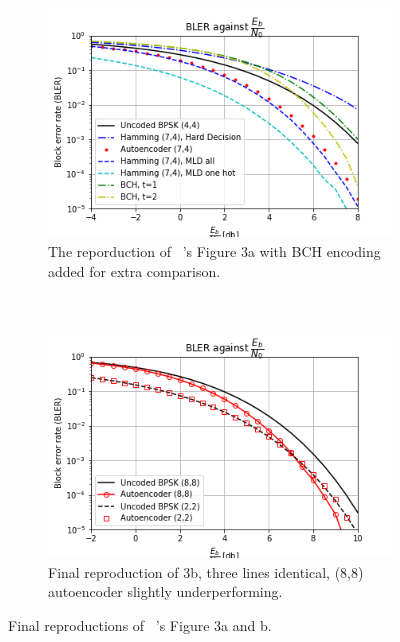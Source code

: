 \documentclass[12pt,onecolumn,letterpaper]{article}
\begin{document}
\begin{figure}[t!]
   \centering
   \begin{subfigure}[t]{0.45\textwidth}
      \centering
      \includegraphics[width=\linewidth]{figures/o_shea_3a_bler_vs_eb_bch.png}
      \caption{The reporduction of ~\cite{oShea}'s Figure 3a with BCH encoding added for extra comparison.}
      \label{fig:OSheaFigure3aBch}
  \end{subfigure}
 ~
   \begin{subfigure}[t]{0.45\textwidth}
      \centering
      \includegraphics[width=\linewidth]{figures/o_shea_3b_bler_vs_eb.png}
      \caption{Final reproduction of 3b, three lines identical, (8,8) autoencoder slightly underperforming.}
      \label{fig:OSheaFigure3b}
   \end{subfigure}
\caption{Final reproductions of ~\cite{oShea}'s Figure 3a and b.}
\label{fig:OSheaFigureFinal}
\end{figure}
\end{document}
